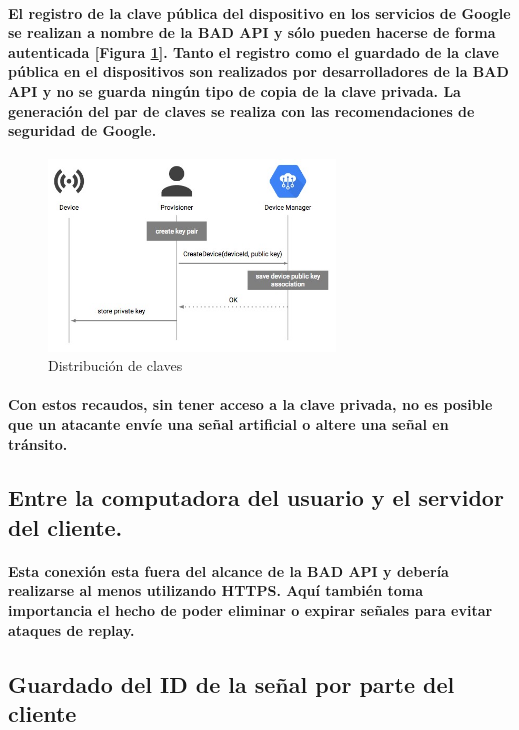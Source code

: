 \documentclass{article}
\begin{document}
\paragraph{
El registro de la clave pública del dispositivo en los servicios de Google se realizan a nombre de la BAD API y sólo pueden hacerse de forma autenticada [Figura \ref{fig:keypairgeneration}]. Tanto el registro como el guardado de la clave pública en el dispositivos son realizados por desarrolladores de la BAD API y no se guarda ningún tipo de copia de la clave privada. La generación del par de claves se realiza con las recomendaciones de seguridad de Google.
}

\begin{figure}[ht]
    \centering
    \includegraphics[width=3in]{key-generation.jpeg}%
    \caption{Distribución de claves}
    \label{fig:keypairgeneration}
\end{figure}

\paragraph{
Con estos recaudos, sin tener acceso a la clave privada, no es posible que un atacante envíe una señal artificial o altere una señal en tránsito.
}

\subsection{Entre la computadora del usuario y el servidor del cliente.}
\paragraph{
Esta conexión esta fuera del alcance de la BAD API y debería realizarse al menos utilizando HTTPS. Aquí también toma importancia el hecho de poder eliminar o expirar señales para evitar ataques de replay.
}
\subsection{Guardado del ID de la señal por parte del cliente}
\end{document}
